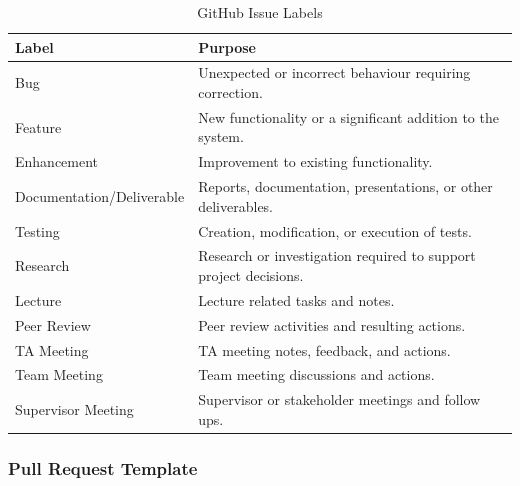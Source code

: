 \documentclass{article}
\begin{document}
\begin{table}[H]
    \centering
    \begin{tabular}{|l|p{8.5cm}|}
        \hline
        \textbf{Label} & \textbf{Purpose} \\ \hline

        Bug &
        Unexpected or incorrect behaviour requiring correction. \\ \hline

        Feature &
        New functionality or a significant addition to the system. \\ \hline

        Enhancement &
        Improvement to existing functionality. \\ \hline

        Documentation/Deliverable &
        Reports, documentation, presentations, or other deliverables. \\ \hline

        Testing &
        Creation, modification, or execution of tests. \\ \hline

        Research &
        Research or investigation required to support project decisions. \\ \hline

        Lecture &
        Lecture related tasks and notes. \\ \hline

        Peer Review &
        Peer review activities and resulting actions. \\ \hline

        TA Meeting &
        TA meeting notes, feedback, and actions. \\ \hline

        Team Meeting &
        Team meeting discussions and actions. \\ \hline

        Supervisor Meeting &
        Supervisor or stakeholder meetings and follow ups. \\ \hline
    \end{tabular}

    \caption{GitHub Issue Labels}
    \label{tab:issue-labels}
\end{table}


\subsubsection{Pull Request Template}
\end{document}
